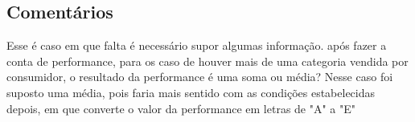 \subsection*{Comentários}
Esse é caso em que falta é necessário supor algumas informação.
após fazer a conta de performance, para os caso de houver mais de uma categoria vendida por consumidor, o resultado da performance é uma soma ou média?
Nesse caso foi suposto uma média, pois faria mais sentido com as condições estabelecidas depois, em que converte o valor da performance em letras de "A" a "E"